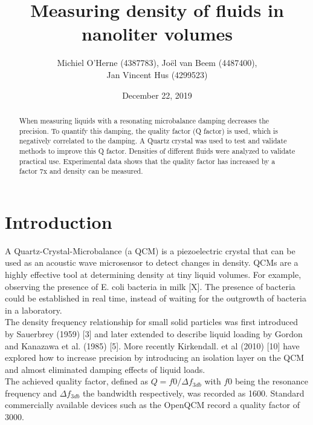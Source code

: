 \documentclass[a4paper, 10pt, conference]{ieeeconf}      %
\title{\LARGE \bf
Measuring density of fluids in nanoliter volumes
}
\author{Michiel O'Herne (4387783), Joël van Beem (4487400),\\ Jan Vincent Hus (4299523) \\ %
\supervisors{Dr. M.K. (Murali) Ghatkesar, Ir. T.G. (Tomas) Manzaneque}
}
\date{December 22, 2019}
\begin{document}
\maketitle
\thispagestyle{plain}
\pagestyle{plain}


\begin{abstract}
    When measuring liquids with a resonating microbalance damping decreases the precision. To quantify this damping, the quality factor (Q factor)  is used, which is negatively correlated to the damping. A Quartz crystal was used to test and validate methods to improve this Q factor. Densities of different fluids were analyzed to validate practical use. Experimental data shows that the quality factor has increased by a factor 7x and density can be measured. 
\end{abstract}


\section{Introduction}

    A Quartz-Crystal-Microbalance (a QCM) is a piezoelectric crystal that can be used as an acoustic wave microsensor to detect changes in density. QCMs are a highly effective tool at determining density at tiny liquid volumes. For example, observing the presence of E. coli bacteria in milk [X]. The presence of bacteria could be established in real time, instead of waiting for the outgrowth of bacteria in a laboratory.\\

    The density frequency relationship for small solid particles was first introduced by Sauerbrey (1959) [3] and later extended to describe liquid loading by Gordon and Kanazawa et al. (1985) [5]. More recently Kirkendall. et al (2010) [10] have explored how to increase precision by introducing an isolation layer on the QCM and almost eliminated damping effects of liquid loads. \\

    The achieved quality factor, defined as $Q=f0/ \Delta f_{3db}$ with $f0$ being the resonance frequency and $\Delta f_{3db}$ the bandwidth respectively, was recorded as 1600. Standard commercially available devices such as the OpenQCM record a quality factor of 3000. \\
\end{document}
